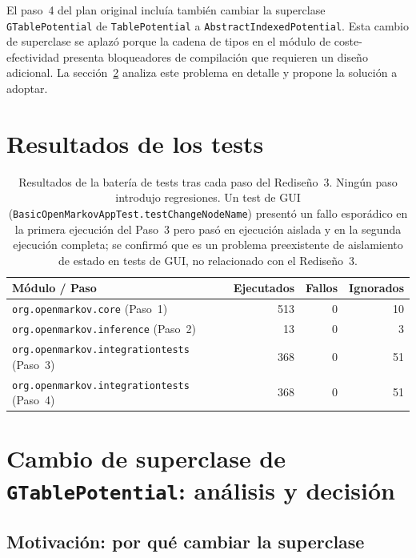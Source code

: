 \documentclass[11pt,a4paper]{article}
\newcommand{\code}[1]{\texttt{#1}}
\begin{document}
El paso~4 del plan original incluía también cambiar la superclase
\code{GTablePotential} de \code{TablePotential} a
\code{AbstractIndexedPotential}.  Esta cambio de superclase se aplazó porque
la cadena de tipos en el módulo de coste-efectividad presenta bloqueadores
de compilación que requieren un diseño adicional.
La sección~\ref{sec:gtable-cambio de superclase} analiza este problema en detalle
y propone la solución a adoptar.

\section{Resultados de los tests}
\label{sec:impl-tests}

\begin{table}[H]
\centering
\begin{tabular}{l|rrr}
\toprule
\textbf{Módulo / Paso} & \textbf{Ejecutados} & \textbf{Fallos} & \textbf{Ignorados} \\
\midrule
\code{org.openmarkov.core} (Paso~1)              & 513 & 0 & 10 \\
\code{org.openmarkov.inference} (Paso~2)         &  13 & 0 &  3 \\
\code{org.openmarkov.integrationtests} (Paso~3)  & 368 & 0 & 51 \\
\code{org.openmarkov.integrationtests} (Paso~4)  & 368 & 0 & 51 \\
\bottomrule
\end{tabular}
\caption{Resultados de la batería de tests tras cada paso del Rediseño~3.
         Ningún paso introdujo regresiones.  Un test de GUI
         (\code{BasicOpenMarkovAppTest.testChangeNodeName}) presentó un fallo
         esporádico en la primera ejecución del Paso~3 pero pasó en
         ejecución aislada y en la segunda ejecución completa; se
         confirmó que es un problema preexistente de aislamiento de estado
         en tests de GUI, no relacionado con el Rediseño~3.}
\label{tab:impl-tests}
\end{table}

\section{Cambio de superclase de \code{GTablePotential}: análisis y decisión}
\label{sec:gtable-cambio de superclase}

\subsection{Motivación: por qué cambiar la superclase}
\label{sec:gtable-motiv}
\end{document}
